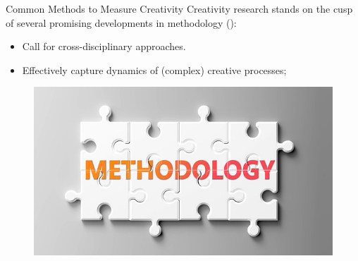 \documentclass[pdf]{beamer}
\begin{document}

\begin{frame}{Common Methods to Measure Creativity}
Creativity research stands on the cusp of several promising developments in methodology (\cite{kaufman_cambridge_2010}):
\begin{itemize}
    \item Call for cross-disciplinary approaches.
    \item Effectively capture dynamics of (complex) creative processes;
\end{itemize}

\vspace{2em}
\begin{figure}
    \centering
    \includegraphics{screenshots/Methodology.jpeg}
\end{figure}
\end{frame}
\end{document}
